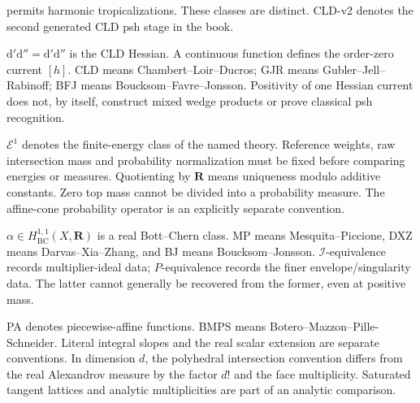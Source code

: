 \documentclass[11pt,a4paper]{article}
\theoremstyle{definition}
\theoremstyle{remark}
\newcommand{\rd}{\mathrm d}
\newcommand{\dprime}{\rd'}
\newcommand{\ddprime}{\rd''}
\newcommand{\dprimeddprime}{\dprime\ddprime}
\begin{document}
\begin{description}
permits harmonic tropicalizations. These classes are distinct.
CLD-v2 denotes the second generated CLD psh stage in the book.
\item[Currents and products.]
\(\dprimeddprime=\dprime\ddprime\) is the CLD Hessian. A continuous
function defines the order-zero current \([h]\). CLD means
Chambert--Loir--Ducros; GJR means Gubler--Jell--Rabinoff; BFJ means
Boucksom--Favre--Jonsson. Positivity of one Hessian current does not, by
itself, construct mixed wedge products or prove classical psh recognition.
\item[Global energy and mass.]
\(\mathcal E^1\) denotes the finite-energy class of the named theory.
Reference weights, raw intersection mass and probability normalization
must be fixed before comparing energies or measures. Quotienting by
\(\mathbf R\) means uniqueness modulo additive constants. Zero top mass
cannot be divided into a probability measure. The affine-cone probability
operator is an explicitly separate convention.
\item[Complex singularity data.]
\(\alpha\in H^{1,1}_{\mathrm{BC}}(X,\mathbf R)\) is a real Bott--Chern class.
MP means Mesquita--Piccione, DXZ means Darvas--Xia--Zhang, and BJ means
Boucksom--Jonsson. \(\mathcal I\)-equivalence records multiplier-ideal data;
\(P\)-equivalence records the finer envelope/singularity data. The latter
cannot generally be recovered from the former, even at positive mass.
\item[Polyhedral normalization.]
PA denotes piecewise-affine functions. BMPS means
Botero--Mazzon--Pille-Schneider. Literal integral slopes and the real scalar
extension are separate conventions. In dimension \(d\), the polyhedral
intersection convention differs from the real Alexandrov measure by the
factor \(d!\) and the face multiplicity. Saturated tangent lattices and
analytic multiplicities are part of an analytic comparison.
\end{description}
\end{document}
